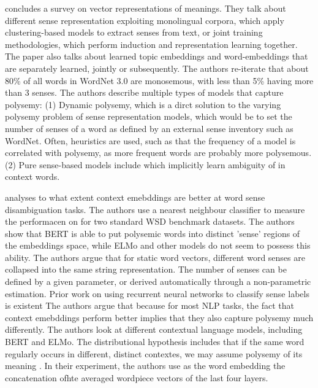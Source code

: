 \documentclass[a4paper,12pt,twoside,openright]{report}
\begin{document}
\cite{camachocollados18} concludes a survey on vector representations of meanings.
They talk about different sense representation exploiting monolingual corpora, which apply clustering-based models to extract senses from text, or joint training methodologies, which perform induction and representation learning together.
The paper also talks about learned topic embeddings and word-embeddings that are separately learned, jointly or subsequently.
The authors re-iterate that about 80\% of all words in WordNet  3.0 are monosemous, with less than 5\% having more than 3 senses.
The authors describe multiple types of models that capture polysemy: 
(1) Dynamic polysemy, which is a dirct solution to the varying polysemy problem of sense representation models, which would be to set the number of senses of a word as defined by an external sense inventory such as WordNet. 
Often, heuristics are used, such as that the frequency of a model is correlated with polysemy, as more frequent words are probably more polysemous.
(2) Pure sense-based models include which implicitly learn ambiguity of in context words.


\cite{wiedmann19} analyses to what extent context emebddings are better at word sense disambiguation tasks.
The authors use a nearest neighbour classifier to measure the performacen on  for two standard WSD benchmark datasets.
The authors show that BERT is able to put polysemic words into distinct 'sense' regions of the embeddings space, while ELMo and other models do not seem to possess this ability.
The authors argue that for static word vectors, different word senses are collapsed into the same string representation.
The number of senses can be defined by a given parameter, or derived automatically through a non-parametric estimation.
Prior work on using recurrent neural networks to classify sense labels is existent
The authors argue that because for most NLP tasks, the fact that context emebddings perform better implies that they also capture polysemy much differently.
The authors look at different contextual language models, including BERT and ELMo.
The distributional hypothesis includes that if the same word regularly occurs in different, distinct contextes, we may assume polysemy of its meaning \cite{miller91}.
In their experiment, the authors use as the word embedding the concatenation ofhte averaged wordpiece vectors of the last four layers. \\
\end{document}
